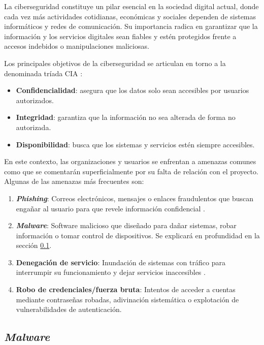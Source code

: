 La ciberseguridad constituye un pilar esencial en la sociedad digital actual, donde cada vez más actividades cotidianas, económicas y sociales dependen de sistemas informáticos y redes de comunicación. Su importancia radica en garantizar que la información y los servicios digitales sean fiables y estén protegidos frente a accesos indebidos o manipulaciones maliciosas.

\vspace{1em}

Los principales objetivos de la ciberseguridad se articulan en torno a la denominada tríada CIA \cite{triadacia}:

\begin{itemize}
	\item \textbf{Confidencialidad}: asegura que los datos solo sean accesibles por usuarios autorizados.
	\item \textbf{Integridad}: garantiza que la información no sea alterada de forma no autorizada.
	\item \textbf{Disponibilidad}: busca que los sistemas y servicios estén siempre accesibles.
\end{itemize}

En este contexto, las organizaciones y usuarios se enfrentan a amenazas comunes como que se comentarán superficialmente por su falta de relación con el proyecto. Algunas de las amenazas más frecuentes son:

\begin{enumerate}
	\item \textbf{\textit{Phishing}}: Correos electrónicos, mensajes o enlaces fraudulentos que buscan engañar al usuario para que revele información confidencial \cite{phishing}.
	\item \textbf{\textit{Malware}}: Software malicioso que diseñado para dañar sistemas, robar información o tomar control de dispositivos. Se explicará en profundidad en la sección \ref{subsec:malware}.
	\item \textbf{Denegación de servicio}: Inundación de sistemas con tráfico para interrumpir su funcionamiento y dejar servicios inaccesibles \cite{dos}.
	\item \textbf{Robo de credenciales/fuerza bruta}: Intentos de acceder a cuentas mediante contraseñas robadas, adivinación sistemática o explotación de vulnerabilidades de autenticación.
\end{enumerate}

\newpage
\subsection{\textit{Malware}}
\label{subsec:malware}

